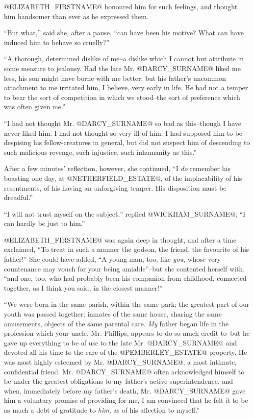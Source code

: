 @ELIZABETH_FIRSTNAME@ honoured him for such feelings, and thought him handsomer than
ever as he expressed them.

``But what,'' said she, after a pause, ``can have been his motive? What can
have induced him to behave so cruelly?''

``A thorough, determined dislike of me--a dislike which I cannot but
attribute in some measure to jealousy. Had the late Mr. @DARCY_SURNAME@ liked me
less, his son might have borne with me better; but his father's uncommon
attachment to me irritated him, I believe, very early in life. He had
not a temper to bear the sort of competition in which we stood--the sort
of preference which was often given me.''

``I had not thought Mr. @DARCY_SURNAME@ so bad as this--though I have never liked
him. I had not thought so very ill of him. I had supposed him to be
despising his fellow-creatures in general, but did not suspect him of
descending to such malicious revenge, such injustice, such inhumanity as
this.''

After a few minutes' reflection, however, she continued, ``I \textit{do}
remember his boasting one day, at @NETHERFIELD_ESTATE@, of the implacability of
his resentments, of his having an unforgiving temper. His disposition
must be dreadful.''

``I will not trust myself on the subject,'' replied @WICKHAM_SURNAME@; ``I can hardly
be just to him.''

@ELIZABETH_FIRSTNAME@ was again deep in thought, and after a time exclaimed, ``To
treat in such a manner the godson, the friend, the favourite of his
father!'' She could have added, ``A young man, too, like \textit{you}, whose very
countenance may vouch for your being amiable''--but she contented herself
with, ``and one, too, who had probably been his companion from childhood,
connected together, as I think you said, in the closest manner!''

``We were born in the same parish, within the same park; the greatest
part of our youth was passed together; inmates of the same house,
sharing the same amusements, objects of the same parental care. \textit{My}
father began life in the profession which your uncle, Mr. Phillips,
appears to do so much credit to--but he gave up everything to be of
use to the late Mr. @DARCY_SURNAME@ and devoted all his time to the care of the
@PEMBERLEY_ESTATE@ property. He was most highly esteemed by Mr. @DARCY_SURNAME@, a most
intimate, confidential friend. Mr. @DARCY_SURNAME@ often acknowledged himself to
be under the greatest obligations to my father's active superintendence,
and when, immediately before my father's death, Mr. @DARCY_SURNAME@ gave him a
voluntary promise of providing for me, I am convinced that he felt it to
be as much a debt of gratitude to \textit{him}, as of his affection to myself.''

